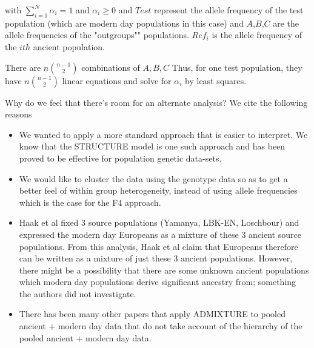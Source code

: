 with $\sum_{i=1}^N \alpha_i = 1$ and $\alpha_i \geq 0$ and $Test$ represent the allele frequency of the test population (which are modern day populations in this case) and $A$,$B$,$C$ are the allele frequencies of the "outgroups"" populations. $Ref_i$ is the allele frequency of the $ith$ ancient population.

There are $n{n-1 \choose 2}$ combinations of $A,B,C$ Thus, for one test population, they have $n{n-1 \choose 2}$ linear equations and solve for $\alpha_i$ by least squares. 

Why do we feel that there's room for an alternate analysis? We cite the following reasons

\begin{itemize}

\item We wanted to apply a more standard approach that is easier to interpret. We know that the STRUCTURE model is one such approach and has been proved to be effective for population genetic data-sets. 

\item We would like to cluster the data using the genotype data so as to get a better feel of within group heterogeneity, instead of using  allele frequencies which is the case for the F4 approach. 

\item Haak et al fixed 3 source populations (Yamanya, LBK-EN, Loschbour) and expressed the modern day Europeans as a mixture of these 3 ancient source populations. From this analysis, Haak et al claim that Europeans therefore can be written as a mixture of just these 3 ancient populations. However, there might be a possibility that there are some unknown ancient populations which modern day populations derive significant ancestry from; something the authors did not investigate. 

\item There has been many other papers that apply ADMIXTURE to pooled ancient + modern day data that do not take account of the hierarchy of the pooled ancient + modern day data. 

\end{itemize}

